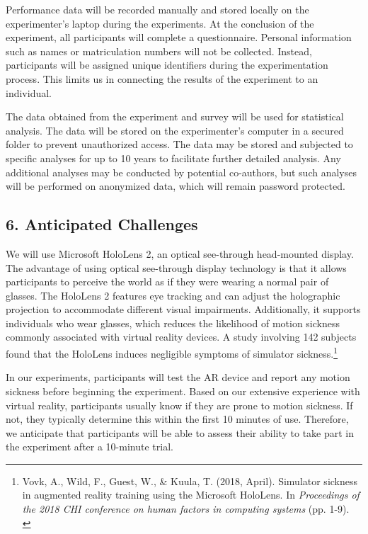 \documentclass[A4,11pt]{article}
\begin{document}
Performance data will be recorded manually and stored locally on the experimenter's laptop during the experiments. At the conclusion of the experiment, all participants will complete a questionnaire. Personal information such as names or matriculation numbers will not be collected. Instead, participants will be assigned unique identifiers during the experimentation process. This limits us in connecting the results of the experiment to an individual. 

The data obtained from the experiment and survey will be used for statistical analysis. The data will be stored on the experimenter's computer in a secured folder to prevent unauthorized access. The data may be stored and subjected to specific analyses for up to 10 years to facilitate further detailed analysis. Any additional analyses may be conducted by potential co-authors, but such analyses will be performed on anonymized data, which will remain password protected.

\subsection*{6. Anticipated Challenges}
We will use Microsoft HoloLens 2, an optical see-through head-mounted display. The advantage of using optical see-through display technology is that it allows participants to perceive the world as if they were wearing a normal pair of glasses. The HoloLens 2 features eye tracking and can adjust the holographic projection to accommodate different visual impairments. Additionally, it supports individuals who wear glasses, which reduces the likelihood of motion sickness commonly associated with virtual reality devices. A study involving 142 subjects found that the HoloLens induces negligible symptoms of simulator sickness.\footnote{Vovk, A., Wild, F., Guest, W., \& Kuula, T. (2018, April). Simulator sickness in augmented reality training using the Microsoft HoloLens. In \textit{Proceedings of the 2018 CHI conference on human factors in computing systems} (pp. 1-9).\\}

In our experiments, participants will test the AR device and report any motion sickness before beginning the experiment. Based on our extensive experience with virtual reality, participants usually know if they are prone to motion sickness. If not, they typically determine this within the first 10 minutes of use. Therefore, we anticipate that participants will be able to assess their ability to take part in the experiment after a 10-minute trial.
\end{document}
